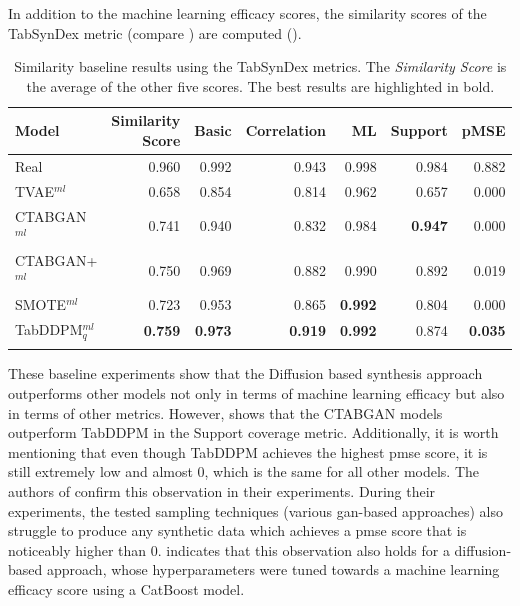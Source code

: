 In addition to the machine learning efficacy scores, the similarity scores of the TabSynDex metric (compare ) are computed ().

\begin{table}[h]
	\centering
	\begin{tabular}{lrrrrrr}
		\toprule
		\textbf{Model}     & \textbf{Similarity Score} & \textbf{Basic} & \textbf{Correlation} & \textbf{ML}    & \textbf{Support} & \textbf{pMSE}  \\
		\midrule
		Real               & 0.960                     & 0.992          & 0.943                & 0.998          & 0.984            & 0.882          \\
		TVAE$^{ml}$        & 0.658                     & 0.854          & 0.814                & 0.962          & 0.657            & 0.000          \\
		CTABGAN$^{ml}$     & 0.741                     & 0.940          & 0.832                & 0.984          & \textbf{0.947}   & 0.000          \\
		CTABGAN+$^{ml}$    & 0.750                     & 0.969          & 0.882                & 0.990          & 0.892            & 0.019          \\
		SMOTE$^{ml}$       & 0.723                     & 0.953          & 0.865                & \textbf{0.992} & 0.804            & 0.000          \\
		TabDDPM$^{ml}_{q}$ & \textbf{0.759}            & \textbf{0.973} & \textbf{0.919}       & \textbf{0.992} & 0.874            & \textbf{0.035} \\
		\bottomrule
		\multicolumn{7}{c}{}\\[-0.6em]
	\end{tabular}
	\caption[TabSynDex Baseline]{Similarity baseline results using the TabSynDex metrics. The \textit{Similarity Score} is the average of the other five scores. The best results are highlighted in bold.}
	\label{tab:sim_baseline}
\end{table}

These baseline experiments show that the Diffusion based synthesis approach outperforms other models not only in terms of machine learning efficacy but also in terms of other metrics.
However,  shows that the CTABGAN models outperform TabDDPM in the Support coverage metric.
Additionally, it is worth mentioning that even though TabDDPM achieves the highest \gls{pmse} score, it is still extremely low and almost 0, which is the same for all other models.
The authors of \cite{chundawat2022UniversalMetricRobust} confirm this observation in their experiments.
During their experiments, the tested sampling techniques (various \gls{gan}-based approaches) also struggle to produce any synthetic data which achieves a \gls{pmse} score that is noticeably higher than 0.
 indicates that this observation also holds for a diffusion-based approach, whose hyperparameters were tuned towards a machine learning efficacy score using a CatBoost model.

